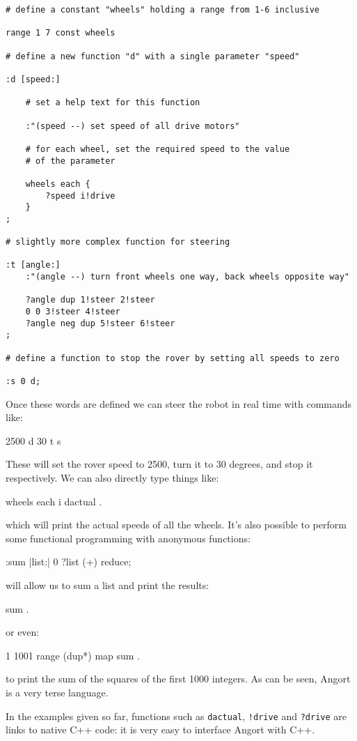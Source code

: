 \begin{lstlisting}
# define a constant "wheels" holding a range from 1-6 inclusive

range 1 7 const wheels

# define a new function "d" with a single parameter "speed"

:d [speed:]

    # set a help text for this function

    :"(speed --) set speed of all drive motors"
    
    # for each wheel, set the required speed to the value
    # of the parameter
    
    wheels each {
        ?speed i!drive
    }
;

# slightly more complex function for steering

:t [angle:]
    :"(angle --) turn front wheels one way, back wheels opposite way"
    
    ?angle dup 1!steer 2!steer
    0 0 3!steer 4!steer
    ?angle neg dup 5!steer 6!steer
;

# define a function to stop the rover by setting all speeds to zero

:s 0 d;

\end{lstlisting}
Once these words are defined we can steer the robot in real time with
commands like:
\begin{v}
2500 d
30 t
s
\end{v}
These will set the rover speed to 2500, turn it to 30 degrees, and stop
it respectively. We can also directly type things like:
\begin{v}
wheels each { i dactual .}
\end{v}
which will print the actual speeds of all the wheels.
It's also possible to perform some functional programming with
anonymous functions:
\begin{v}
:sum |list:| 0 ?list (+) reduce;
\end{v}
will allow us to sum a list and print the results:
\begin{v}
[1,2,3,4,5] sum .
\end{v}
or even:
\begin{v}
1 1001 range (dup*) map sum .
\end{v}
to print the sum of the squares of the first 1000 integers.
As can be seen, Angort is a very terse language.

In the examples given so far, functions such as \texttt{dactual},
\texttt{!drive} and \texttt{?drive} are links to native C++ code: it
is very easy to interface Angort with C++.


